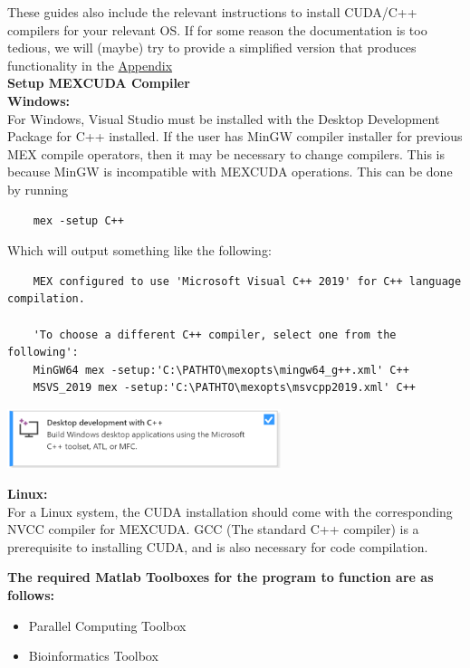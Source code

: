 \documentclass[11pt,letterpaper]{article}
\begin{document}
These guides also include the relevant instructions to install CUDA/C++ compilers for your relevant OS. If for some reason the documentation is too tedious, we will (maybe) try to provide a simplified version that produces functionality in the \hyperref[sec:compilerinstall]{Appendix}\\

\textbf{Setup MEXCUDA Compiler}\\

\textbf{Windows:}\\

For Windows, Visual Studio must be installed with the Desktop Development Package for C++ installed. If the user has MinGW compiler installer for previous MEX compile operators, then it may be necessary to change compilers. This is because MinGW is incompatible with MEXCUDA operations. This can be done by running

\begin{verbatim}
    mex -setup C++
\end{verbatim}

Which will output something like the following:

\begin{verbatim}
    MEX configured to use 'Microsoft Visual C++ 2019' for C++ language compilation.

    'To choose a different C++ compiler, select one from the following':
    MinGW64 mex -setup:'C:\PATHTO\mexopts\mingw64_g++.xml' C++
    MSVS_2019 mex -setup:'C:\PATHTO\mexopts\msvcpp2019.xml' C++ 
\end{verbatim}

\begin{center}
    \includegraphics[width = 0.6\textwidth]{Windows_Compiler.png}
\end{center}

\textbf{Linux:}\\

For a Linux system, the CUDA installation should come with the corresponding NVCC compiler for MEXCUDA. GCC (The standard C++ compiler) is a prerequisite to installing CUDA, and is also necessary for code compilation.

\bigskip

\textbf{The required Matlab Toolboxes for the program to function are as follows:}
\begin{itemize}
    \item Parallel Computing Toolbox
    \item Bioinformatics Toolbox
\end{itemize}
\end{document}
